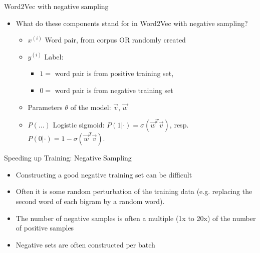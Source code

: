 
\begin{vbframe}{Word2Vec with negative sampling}

\vfill

\begin{itemize}
	\item \ques What do these components stand for in Word2Vec with negative sampling?
		\begin{itemize}
			\item $x^{(i)}$ Word pair, from corpus OR randomly created
			\item $y^{(i)}$ Label: 
					\begin{itemize}
						\item $1 = $ word pair is from positive training set,
						\item $0 = $ word pair is from negative training set
					\end{itemize} 
			\item Parameters $\theta$ of the model: $\vec v$, $\vec w$
			\item $P(...)$ Logistic sigmoid: $P(1|\cdot) = \sigma(\vec w^T \vec v)$, resp. $P(0|\cdot) = 1-\sigma(\vec w^T \vec v)$.
		\end{itemize}
\end{itemize}

\vfill

\end{vbframe}


\begin{vbframe}{Speeding up Training: Negative Sampling}

\vfill

\begin{itemize}
	\item Constructing a good negative training set can be difficult
	\item Often it is some random perturbation of the training data (e.g. replacing the second word of each bigram by a random word).
	\item The number of negative samples is often a multiple (1x to 20x) of the number of positive samples
	\item Negative sets are often constructed per batch
\end{itemize}

\vfill

\end{vbframe}

